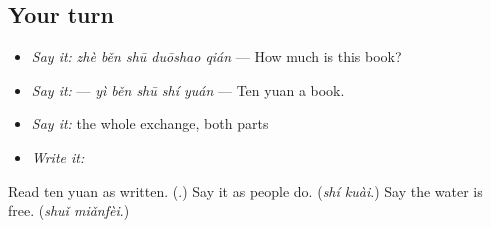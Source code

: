 \subsection*{Your turn}
\begin{itemize}
\raggedright
  \item \emph{Say it:} \emph{zhè běn shū duōshao qián} — How much is this book?
  \item \emph{Say it:}  — \emph{yì běn shū shí yuán} — Ten yuan a book.
  \item \emph{Say it:} the whole exchange, both parts
  \item \emph{Write it:} 
\end{itemize}

\begin{tcolorbox}[breakable,colback=teal!4,colframe=teal!35!black,title={Before you move on}]
Read ten yuan as written. (\textbf{}.) Say it as people do. (\emph{shí kuài}.) Say the water is free. (\emph{shuǐ miǎnfèi}.)
\end{tcolorbox}
